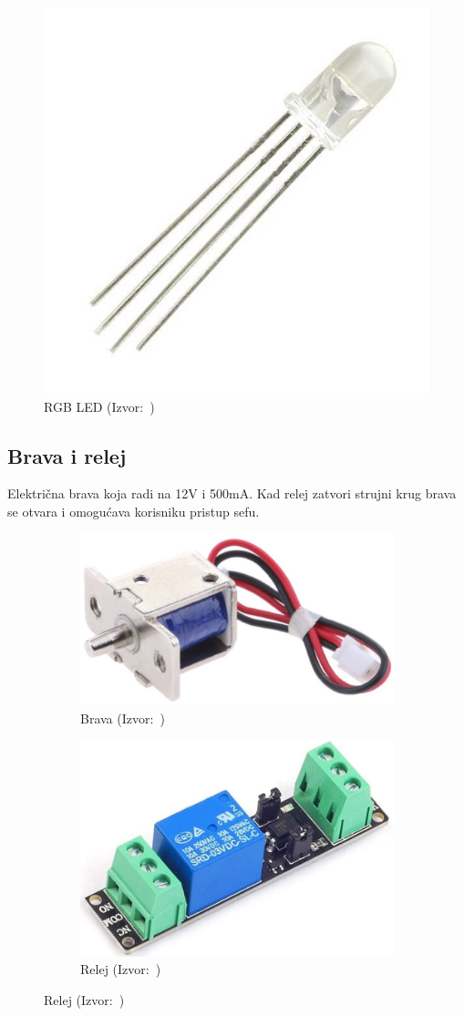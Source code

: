 \begin{figure}[h!]
    \centering
    \includegraphics[scale=0.7]{images/rgb-led}
    \caption{RGB LED (Izvor:~\cite{robotistan-led})}
\end{figure}

\subsection{Brava i relej}

Električna brava koja radi na 12V i 500mA\@.
Kad relej zatvori strujni krug brava se otvara i omogućava korisniku pristup sefu.

\begin{figure}[h!]
    \centering
    \begin{subfigure}{.5\textwidth}
        \centering
        \includegraphics[width=.4\linewidth]{images/door-lock}
        \caption{Brava (Izvor:~\cite{ebay-doorlock})}
    \end{subfigure}%
    \begin{subfigure}{.5\textwidth}
        \centering
        \includegraphics[width=.4\linewidth]{images/relay}
        \caption{Relej (Izvor:~\cite{amazon-relay})}
    \end{subfigure}
\end{figure}


